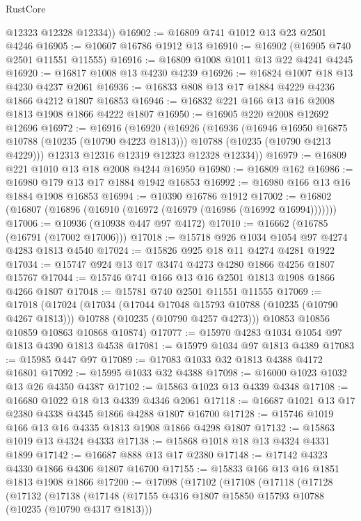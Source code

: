 \begin{lexlean}{RustCore}
\begin{coremodule}
        @12323
        @12328
        @12334))
@16902 := @16809 @741 @1012 @13 @23 @2501 @4246
@16905 := @10607 @16786 @1912 @13
@16910 := @16902 (@16905 @740 @2501 @11551 @11555)
@16916 := @16809 @1008 @1011 @13 @22 @4241 @4245
@16920 := @16817 @1008 @13 @4230 @4239
@16926 := @16824 @1007 @18 @13 @4230 @4237 @2061
@16936 := @16833 @808 @13 @17 @1884 @4229 @4236 @1866 @4212 @1807 @16853
@16946 := @16832 @221 @166 @13 @16 @2008 @1813 @1908 @1866 @4222 @1807
@16950 := @16905 @220 @2008 @12692 @12696
@16972 := @16916
    (@16920
      (@16926
        (@16936
          (@16946 @16950 @16875 @10788 (@10235 (@10790 @4223 @1813)))
          @10788
          (@10235 (@10790 @4213 @4229)))
        @12313
        @12316
        @12319
        @12323
        @12328
        @12334))
@16979 := @16809 @221 @1010 @13 @18 @2008 @4244 @16950
@16980 := @16809 @162
@16986 := @16980 @179 @13 @17 @1884 @1942 @16853
@16992 := @16980 @166 @13 @16 @1884 @1908 @16853
@16994 := @10390 @16786 @1912
@17002 := @16802 (@16807 (@16896 (@16910 (@16972 (@16979 (@16986 (@16992 @16994)))))))
@17006 := @10936 (@10938 @447 @97 @4172)
@17010 := @16662 (@16785 (@16791 (@17002 @17006)))
@17018 := @15718 @926 @1034 @1054 @97 @4274 @4283 @1813 @4540
@17024 := @15826 @925 @18 @11 @4274 @4281 @1922
@17034 := @15747 @924 @13 @17 @3474 @4273 @4280 @1866 @4256 @1807 @15767
@17044 := @15746 @741 @166 @13 @16 @2501 @1813 @1908 @1866 @4266 @1807
@17048 := @15781 @740 @2501 @11551 @11555
@17069 := @17018
    (@17024
      (@17034
        (@17044 @17048 @15793 @10788 (@10235 (@10790 @4267 @1813)))
        @10788
        (@10235 (@10790 @4257 @4273)))
      @10853
      @10856
      @10859
      @10863
      @10868
      @10874)
@17077 := @15970 @4283 @1034 @1054 @97 @1813 @4390 @1813 @4538
@17081 := @15979 @1034 @97 @1813 @4389
@17083 := @15985 @447 @97
@17089 := @17083 @1033 @32 @1813 @4388 @4172 @16801
@17092 := @15995 @1033 @32 @4388
@17098 := @16000 @1023 @1032 @13 @26 @4350 @4387
@17102 := @15863 @1023 @13 @4339 @4348
@17108 := @16680 @1022 @18 @13 @4339 @4346 @2061
@17118 := @16687 @1021 @13 @17 @2380 @4338 @4345 @1866 @4288 @1807 @16700
@17128 := @15746 @1019 @166 @13 @16 @4335 @1813 @1908 @1866 @4298 @1807
@17132 := @15863 @1019 @13 @4324 @4333
@17138 := @15868 @1018 @18 @13 @4324 @4331 @1899
@17142 := @16687 @888 @13 @17 @2380
@17148 := @17142 @4323 @4330 @1866 @4306 @1807 @16700
@17155 := @15833 @166 @13 @16 @1851 @1813 @1908 @1866
@17200 := @17098
    (@17102
      (@17108
        (@17118
          (@17128
            (@17132
              (@17138
                (@17148
                  (@17155 @4316 @1807 @15850 @15793 @10788 (@10235 (@10790 @4317 @1813)))

\end{coremodule}
\end{lexlean}
